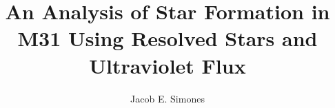 \phd

\title{\bf An Analysis of Star Formation in M31 Using Resolved Stars and Ultraviolet Flux}
\author{Jacob E. Simones}


\abstract{}

\copyrightpage

\acknowledgements{}

\dedication{}

\beforepreface  %

\tablespage

\figurespage

\afterpreface  %
